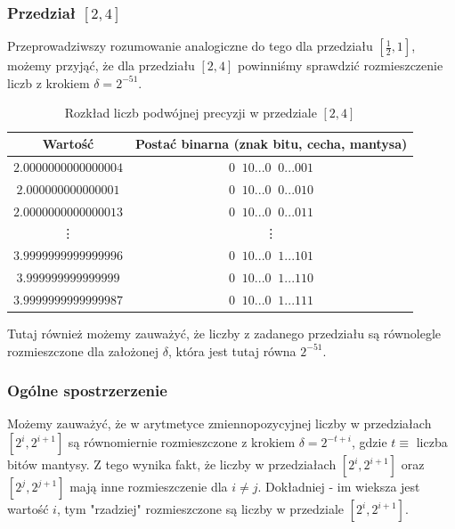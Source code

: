 \documentclass[12pt]{article}
\begin{document}
        \subsubsection*{Przedział $[2, 4]$}
            Przeprowadziwszy rozumowanie analogiczne do tego dla przedziału $[\frac{1}{2}, 1]$, możemy przyjąć,
            że dla przedziału $[2, 4]$ powinniśmy sprawdzić rozmieszczenie liczb z krokiem $\delta = 2^{-51}$.

            \begin{table}[h!]
                \centering
                \begin{tabularx}{0.74\textwidth}{c c}
                    \hline
                    Wartość & Postać binarna (znak bitu, cecha, mantysa) \\
                    \hline
                    $2.0000000000000004$ & $0\;\;10...0\;\;0...001$ \\
                    $2.000000000000001$  & $0\;\;10...0\;\;0...010$ \\
                    $2.0000000000000013$ & $0\;\;10...0\;\;0...011$ \\
                    \vdots & \vdots \\
                    $3.9999999999999996$ & $0\;\;10...0\;\;1...101$ \\
                    $3.999999999999999$  & $0\;\;10...0\;\;1...110$ \\
                    $3.9999999999999987$ & $0\;\;10...0\;\;1...111$ \\
                    \hline
                \end{tabularx}
                \caption{Rozkład liczb podwójnej precyzji w przedziale $[2, 4]$}
                \label{table:arrangement_in_2_4}
            \end{table}

            \noindent Tutaj również możemy zauważyć, że liczby z zadanego przedziału są równolegle rozmieszczone
            dla założonej $\delta$, która jest tutaj równa $2^{-51}$.
            \newline

        \subsubsection*{Ogólne spostrzerzenie}
            Możemy zauważyć, że w arytmetyce zmiennopozycyjnej liczby w przedziałach $[2^i, 2^{i + 1}]$
            są równomiernie rozmieszczone z krokiem $\delta = 2^{-t + i}$, gdzie $t \equiv$ liczba bitów mantysy.
            \newline
            Z tego wynika fakt, że liczby w przedziałach $[2^i, 2^{i + 1}]$ oraz $[2^j, 2^{j + 1}]$ mają inne rozmieszczenie
            dla $i \ne j$. Dokładniej - im wieksza jest wartość $i$, tym "rzadziej" rozmieszczone są
            liczby w przedziale $[2^i, 2^{i + 1}]$.
\end{document}
